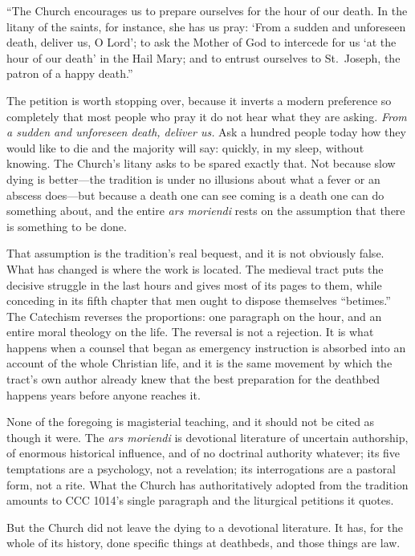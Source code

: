 ``The Church encourages us to prepare ourselves for the hour of our death. In the litany of the saints, for instance, she has us pray: `From a sudden and unforeseen death, deliver us, O Lord'; to ask the Mother of God to intercede for us `at the hour of our death' in the Hail Mary; and to entrust ourselves to St.~Joseph, the patron of a happy death.''

The petition is worth stopping over, because it inverts a modern preference so completely that most people who pray it do not hear what they are asking. \emph{From a sudden and unforeseen death, deliver us.} Ask a hundred people today how they would like to die and the majority will say: quickly, in my sleep, without knowing. The Church's litany asks to be spared exactly that. Not because slow dying is better---the tradition is under no illusions about what a fever or an abscess does---but because a death one can see coming is a death one can do something about, and the entire \emph{ars moriendi} rests on the assumption that there is something to be done.

That assumption is the tradition's real bequest, and it is not obviously false. What has changed is where the work is located. The medieval tract puts the decisive struggle in the last hours and gives most of its pages to them, while conceding in its fifth chapter that men ought to dispose themselves ``betimes.'' The Catechism reverses the proportions: one paragraph on the hour, and an entire moral theology on the life. The reversal is not a rejection. It is what happens when a counsel that began as emergency instruction is absorbed into an account of the whole Christian life, and it is the same movement by which the tract's own author already knew that the best preparation for the deathbed happens years before anyone reaches it.

None of the foregoing is magisterial teaching, and it should not be cited as though it were. The \emph{ars moriendi} is devotional literature of uncertain authorship, of enormous historical influence, and of no doctrinal authority whatever; its five temptations are a psychology, not a revelation; its interrogations are a pastoral form, not a rite. What the Church has authoritatively adopted from the tradition amounts to CCC 1014's single paragraph and the liturgical petitions it quotes.

But the Church did not leave the dying to a devotional literature. It has, for the whole of its history, done specific things at deathbeds, and those things are law.
